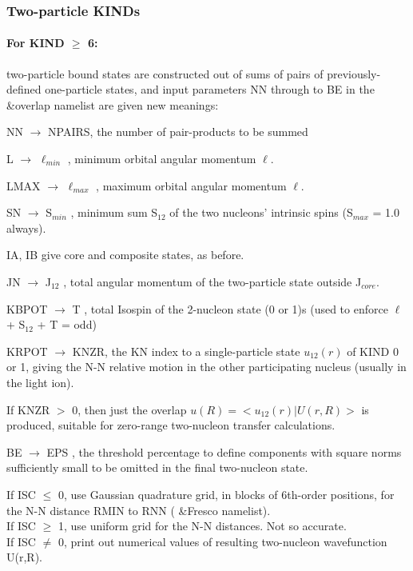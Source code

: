 \documentclass[11pt]{article}
\begin{document}
\subsubsection{Two-particle KINDs}

\paragraph{For KIND $\geq$ 6:}  two-particle bound states are constructed out of sums
of pairs of previously-defined one-particle states,
and input parameters NN through to BE in the \&overlap namelist are given new meanings:

NN    $\rightarrow$ NPAIRS, the number of pair-products to be summed

L     $\rightarrow$ $\ell_{min}$ , minimum orbital angular momentum $\ell$.

LMAX  $\rightarrow$ $\ell_{max}$  , maximum orbital angular momentum $\ell$.


SN    $\rightarrow$ S$_{min}$  , minimum sum S$_{12}$ of the two nucleons' intrinsic spins
                 (S$_{max}$ = 1.0 always).

IA, IB   give core and composite states, as before.

JN    $\rightarrow$ J$_{12}$   , total angular momentum of the two-particle state
outside J$_{core}$.

KBPOT $\rightarrow$ T     , total Isospin  of the 2-nucleon state (0 or 1)s
(used to enforce  $\ell$ + S$_{12}$ + T = odd)

KRPOT $\rightarrow$ KNZR, the KN index to a single-particle state $u_{12}(r)$
of KIND 0 or 1, giving the N-N relative motion in the
other participating nucleus (usually in the light ion).

If KNZR $>$ 0, then just the overlap $ u(R)  =  <u_{12}(r) | U(r,R) > $ is
produced, suitable for zero-range two-nucleon transfer calculations.

BE    $\rightarrow$ EPS   , the threshold percentage to define components with
square norms sufficiently small to be omitted in the final two-nucleon
state.

      If ISC $\le$ 0, use Gaussian quadrature grid, in blocks of 6th-order
      positions, for the N-N distance RMIN to RNN ( \&Fresco namelist).
\\  If ISC $\geq$ 1, use uniform grid for the N-N distances.  Not so accurate.
\\  If ISC $\neq$ 0, print out numerical values of resulting two-nucleon wavefunction
U(r,R).
\end{document}
